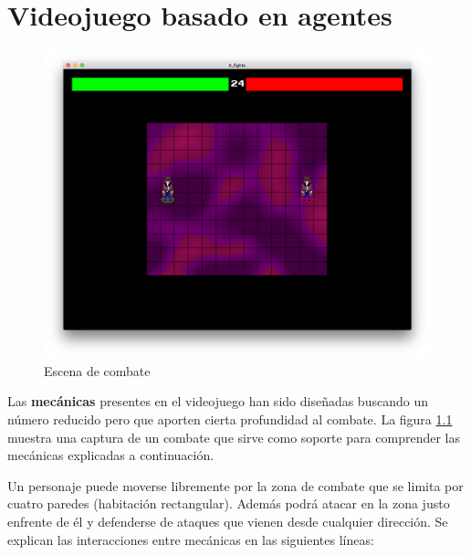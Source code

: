 \chapter{Videojuego basado en agentes}

\begin{figure}[h]
	\centerline{\includegraphics[width=12.5cm]{otros/manual/pelea1.png}}
	\caption{Escena de combate}
	\label{ejemploVideojuego}
\end{figure}

Las \textbf{mecánicas} presentes en el videojuego han sido diseñadas buscando un número reducido pero que aporten cierta profundidad al combate. La figura \ref{ejemploVideojuego} muestra una captura de un combate que sirve como soporte para comprender las mecánicas explicadas a continuación.

\bigskip

Un personaje puede moverse libremente por la zona de combate que se limita por cuatro paredes (habitación rectangular). Además podrá atacar en la zona justo enfrente de él y defenderse de ataques que vienen desde cualquier dirección. Se explican las interacciones entre mecánicas en las siguientes líneas:

